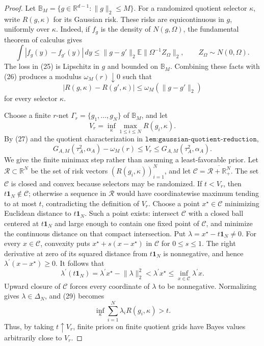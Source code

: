 \documentclass{article}
\begin{document}
\begin{proof}
Let \(\mathbb B_M=\{g\in\mathbb R^{d-1}:\lVert g\rVert_2\leq M\}\).  For a randomized quotient selector \(\kappa\), write \(R(g,\kappa)\) for its Gaussian risk.  These risks are equicontinuous in \(g\), uniformly over \(\kappa\).  Indeed, if \(f_g\) is the density of \(N(g,\Omega)\), the fundamental theorem of calculus gives
\[
 \int|f_g(y)-f_{g'}(y)|\,dy
 \leq \lVert g-g'\rVert_2
       \mathbb E\lVert\Omega^{-1}Z_\Omega\rVert_2,
 \qquad Z_\Omega\sim N(0,\Omega).                              \tag{26}
\]
The loss in (25) is Lipschitz in \(g\) and bounded on \(\mathbb B_M\).  Combining these facts with (26) produces a modulus \(\omega_M(r)\downarrow0\) such that
\[
 |R(g,\kappa)-R(g',\kappa)|
 \leq\omega_M(\lVert g-g'\rVert_2)                              \tag{27}
\]
for every selector \(\kappa\).

Choose a finite \(r\)-net \(\Gamma_r=\{g_1,\ldots,g_N\}\) of \(\mathbb B_M\), and let
\[
 V_r=\inf_\kappa\max_{1\leq i\leq N}R(g_i,\kappa).
\]
By (27) and the quotient characterization in \(\texttt{lem:gaussian-quotient-reduction}\),
\[
 G_{A,M}(\tau_A^2,\alpha_A)-\omega_M(r)
 \leq V_r\leq G_{A,M}(\tau_A^2,\alpha_A).                       \tag{28}
\]
We give the finite minimax step rather than assuming a least-favorable prior.  Let \(\mathscr R\subset\mathbb R^N\) be the set of risk vectors
\((R(g_i,\kappa))_{i=1}^N\), and let
\(\mathscr C=\overline{\mathscr R+\mathbb R_+^N}\).  The set \(\mathscr C\) is closed and convex because selectors may be randomized.  If \(t<V_r\), then \(t\mathbf1_N\notin\mathscr C\); otherwise a sequence in \(\mathscr R\) would have coordinatewise maximum tending to at most \(t\), contradicting the definition of \(V_r\).  Choose a point \(x^\star\in\mathscr C\) minimizing Euclidean distance to \(t\mathbf1_N\).  Such a point exists: intersect \(\mathscr C\) with a closed ball centered at \(t\mathbf1_N\) and large enough to contain one fixed point of \(\mathscr C\), and minimize the continuous distance on that compact intersection.  Put \(\lambda=x^\star-t\mathbf1_N\ne0\).  For every \(x\in\mathscr C\), convexity puts \(x^\star+s(x-x^\star)\) in \(\mathscr C\) for \(0\leq s\leq1\).  The right derivative at zero of its squared distance from \(t\mathbf1_N\) is nonnegative, and hence \(\lambda^{\prime}(x-x^\star)\geq0\).  It follows that
\[
 \lambda^{\prime}(t\mathbf1_N)
 =\lambda^{\prime}x^\star-\lVert\lambda\rVert_2^2
 <\lambda^{\prime}x^\star
 \leq\inf_{x\in\mathscr C}\lambda^{\prime}x.                  \tag{29}
\]
Upward closure of \(\mathscr C\) forces every coordinate of \(\lambda\) to be nonnegative.  Normalizing gives \(\lambda\in\Delta_N\), and (29) becomes
\[
 \inf_\kappa\sum_{i=1}^N\lambda_iR(g_i,\kappa)>t.              \tag{30}
\]
Thus, by taking \(t\uparrow V_r\), finite priors on finite quotient grids have Bayes values arbitrarily close to \(V_r\).


\end{proof}
\end{document}

